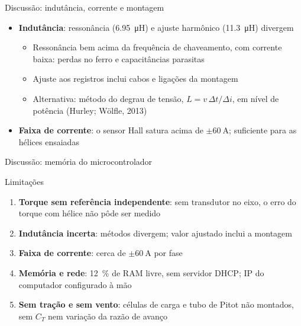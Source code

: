 \begin{frame}{Discussão: indutância, corrente e montagem}
  \begin{itemize}
    \item \textbf{Indutância}: ressonância (\SI{6,95}{\micro\henry}) e ajuste
          harmônico (\SI{11,3}{\micro\henry}) divergem
      \begin{itemize}
        \item Ressonância bem acima da frequência de chaveamento, com
              corrente baixa: perdas no ferro e capacitâncias parasitas
        \item Ajuste aos registros inclui cabos e ligações da montagem
        \item Alternativa: método do degrau de tensão,
              $L = v\,\Delta t/\Delta i$, em nível de potência
              (Hurley; Wölfle, 2013)
      \end{itemize}
    \item \textbf{Faixa de corrente}: o sensor Hall satura acima de
          $\pm\SI{60}{\ampere}$; suficiente para as hélices ensaiadas
  \end{itemize}
\end{frame}

\begin{frame}{Discussão: memória do microcontrolador}
  \centering
\end{frame}

\begin{frame}{Limitações}
  \begin{enumerate}
    \item \textbf{Torque sem referência independente}: sem transdutor no
          eixo, o erro do torque com hélice não pôde ser medido
    \item \textbf{Indutância incerta}: métodos divergem; valor ajustado
          inclui a montagem
    \item \textbf{Faixa de corrente}: cerca de $\pm\SI{60}{\ampere}$ por fase
    \item \textbf{Memória e rede}: \SI{12}{\percent} de RAM livre, sem
          servidor DHCP; IP do computador configurado à mão
    \item \textbf{Sem tração e sem vento}: células de carga e tubo de Pitot
          não montados, sem $C_T$ nem variação da razão de avanço
  \end{enumerate}
\end{frame}
